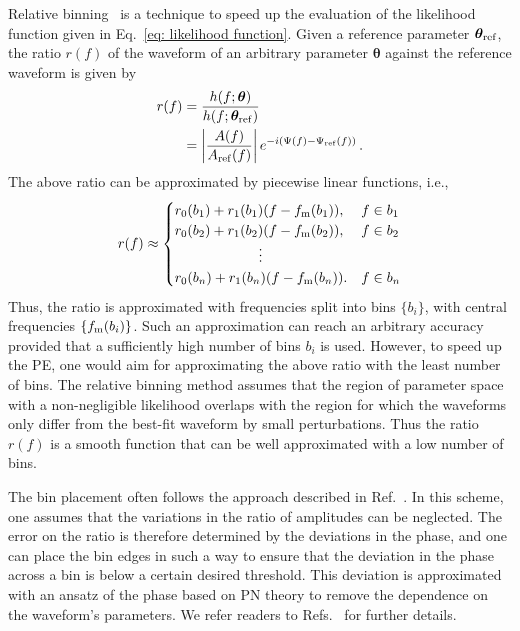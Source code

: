 \documentclass[prd,twocolumn,a4paper,floatfix,nofootinbib,preprintnumbers,superscriptaddress]{revtex4-1}
\begin{document}
\noindent Relative binning~\cite{Zackay:2018qdy, Cornish:2021lje, Krishna:2023bug} is a technique to speed up the evaluation of the likelihood function given in Eq.~\eqref{eq: likelihood function}. Given a reference parameter $\boldsymbol{\theta}_{\rm ref}$, the ratio $r(f)$ of the waveform of an arbitrary parameter $\boldsymbol{\theta}$ against the reference waveform is given by
\begin{equation}\label{eq: relative binning ratio}
\begin{aligned}
     r(f) &= \frac{h(f;\boldsymbol{\theta})}{h(f;\boldsymbol{\theta}_{\rm ref})}\\
     &= \left| \frac{A(f)}{A_{\rm ref}(f)} \right| e^{-i (\Psi(f) - \Psi_{\rm ref}(f))} \, .
\end{aligned}
\end{equation}
The above ratio can be approximated by piecewise linear functions, i.e.,
\begin{equation}
    r(f) \approx
    \begin{cases}
    r_0(b_{1}) + r_1(b_1)(f - f_{\rm m}(b_1)), & f \in b_1\\
    r_0(b_{2}) + r_1(b_2)(f - f_{\rm m}(b_2)), & f \in b_2\\
    \qquad \qquad \qquad \vdots & \\
    r_0(b_{n}) + r_1(b_n)(f - f_{\rm m}(b_n)). & f \in b_n\\
    \end{cases}
\end{equation}
Thus, the ratio is approximated with frequencies split into bins $\{b_i\}$, with central frequencies $\{f_{\rm m}(b_i)\}$. Such an approximation can reach an arbitrary accuracy provided that a sufficiently high number of bins $b_i$ is used. However, to speed up the \ac{PE}, one would aim for approximating the above ratio with the least number of bins. The relative binning method assumes that the region of parameter space with a non-negligible likelihood overlaps with the region for which the waveforms only differ from the best-fit waveform by small perturbations. Thus the ratio $r(f)$ is a smooth function that can be well approximated with a low number of bins.

The bin placement often follows the approach described in Ref.~\cite{Zackay:2018qdy}. In this scheme, one assumes that the variations in the ratio of amplitudes can be neglected. The error on the ratio is therefore determined by the deviations in the phase, and one can place the bin edges in such a way to ensure that the deviation in the phase across a bin is below a certain desired threshold. This deviation is approximated with an ansatz of the phase based on \ac{PN} theory to remove the dependence on the waveform's parameters. We refer readers to Refs.~\cite{Zackay:2018qdy, Krishna:2023bug} for further details.
\end{document}

